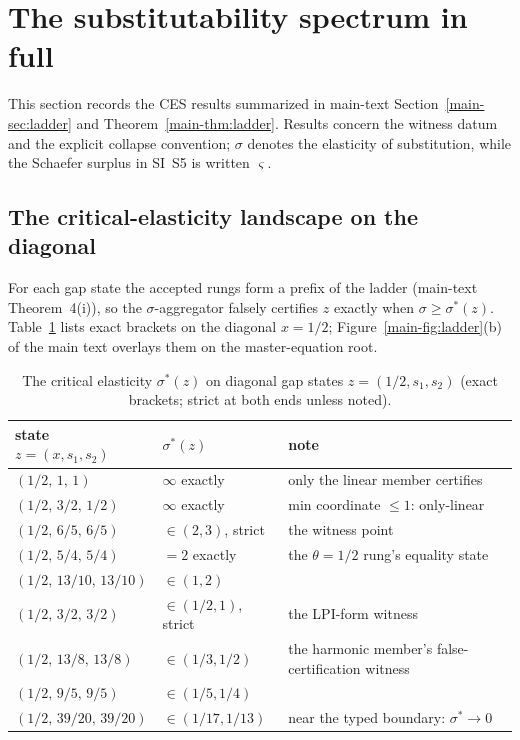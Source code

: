 \section{The substitutability spectrum in full}\label{si:spectrum}

This section records the CES results summarized in main-text Section~\ref{main-sec:ladder} and Theorem~\ref{main-thm:ladder}. Results concern the witness datum and the explicit collapse convention; $\sigma$ denotes the elasticity of substitution, while the Schaefer surplus in SI~S5 is written $\varsigma$.

\subsection{The critical-elasticity landscape on the diagonal}

For each gap state the accepted rungs form a prefix of the ladder (main-text Theorem~4(i)), so the $\sigma$-aggregator falsely certifies $z$ exactly when $\sigma\ge\sigma^*(z)$. Table~\ref{tab:sigmastar} lists exact brackets on the diagonal $x=1/2$; Figure~\ref{main-fig:ladder}(b) of the main text overlays them on the master-equation root.

\begin{table}[!htbp]
\centering\small
\caption{The critical elasticity $\sigma^*(z)$ on diagonal gap states $z=(1/2,s_1,s_2)$ (exact brackets; strict at both ends unless noted).}
\label{tab:sigmastar}
\begin{tabular}{@{}llp{6.4cm}@{}}
\toprule
state $z=(x,s_1,s_2)$ & $\sigma^*(z)$ & note \\
\midrule
$(1/2,\,1,\,1)$ & $\infty$ exactly & only the linear member certifies \\
$(1/2,\,3/2,\,1/2)$ & $\infty$ exactly & min coordinate $\le1$: only-linear \\
$(1/2,\,6/5,\,6/5)$ & $\in(2,3)$, strict & the witness point \\
$(1/2,\,5/4,\,5/4)$ & $=2$ exactly & the $\theta=1/2$ rung's equality state \\
$(1/2,\,13/10,\,13/10)$ & $\in(1,2)$ & \\
$(1/2,\,3/2,\,3/2)$ & $\in(1/2,1)$, strict & the LPI-form witness \\
$(1/2,\,13/8,\,13/8)$ & $\in(1/3,1/2)$ & the harmonic member's false-certification witness \\
$(1/2,\,9/5,\,9/5)$ & $\in(1/5,1/4)$ & \\
$(1/2,\,39/20,\,39/20)$ & $\in(1/17,1/13)$ & near the typed boundary: $\sigma^*\to0$ \\
\bottomrule
\end{tabular}
\end{table}

